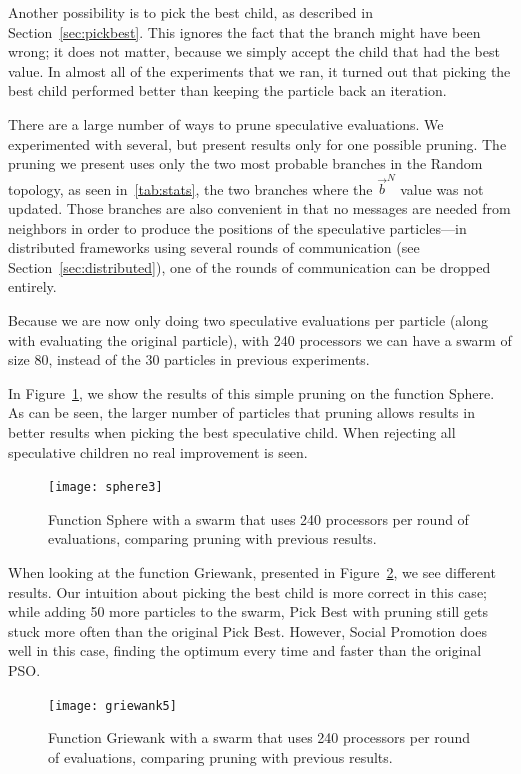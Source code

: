 \documentclass[journal,letterpaper]{IEEEtran}
\renewcommand{\sec}[1]{Section~\ref{sec:#1}}
\newcommand{\fig}[1]{Figure~\ref{fig:#1}}
\providecommand{\neigh}{\ensuremath{N}}
\providecommand{\nbest}{\ensuremath{\Vec{b}^\neigh}}
\begin{document}
Another possibility is to pick the best child, as described in \sec{pickbest}.
This ignores the fact that the branch might have been wrong; it does not
matter, because we simply accept the child that had the best value.  In almost
all of the experiments that we ran, it turned out that picking the best child
performed better than keeping the particle back an iteration.

There are a large number of ways to prune speculative evaluations.  We
experimented with several, but present results only for one possible pruning.
The pruning we present uses only the two most probable branches in the Random
topology, as seen in~\ref{tab:stats}, the two branches where the $\nbest$ value
was not updated.  Those branches are also convenient in that no messages are
needed from neighbors in order to produce the positions of the speculative
particles---in distributed frameworks using several rounds of communication
(see \sec{distributed}), one of the rounds of communication can be dropped
entirely.

Because we are now only doing two speculative evaluations per particle (along
with evaluating the original particle), with 240 processors we can have a swarm
of size 80, instead of the 30 particles in previous experiments.  

In \fig{sphere-pruned}, we show the results of this simple pruning on the
function Sphere.  As can be seen, the larger number of particles that pruning
allows results in better results when picking the best speculative child.  
When rejecting all speculative children no real improvement is seen.

\begin{figure}
  \centering
  \texttt{[image: sphere3]}
  \caption{Function Sphere with a swarm that uses 240 processors per round of
  evaluations, comparing pruning with previous results.}
  \label{fig:sphere-pruned}
\end{figure}

When looking at the function Griewank, presented in \fig{griewank-pruned}, we
see different results.  Our intuition about picking the best child is more
correct in this case; while adding 50 more particles to the swarm, Pick Best
with pruning still gets stuck more often than the original Pick Best.  However,
Social Promotion does well in this case, finding the optimum every time and
faster than the original PSO.

\begin{figure}
  \centering
  \texttt{[image: griewank5]}
  \caption{Function Griewank with a swarm that uses 240 processors per round of
  evaluations, comparing pruning with previous results.}
  \label{fig:griewank-pruned}
\end{figure}
\end{document}
